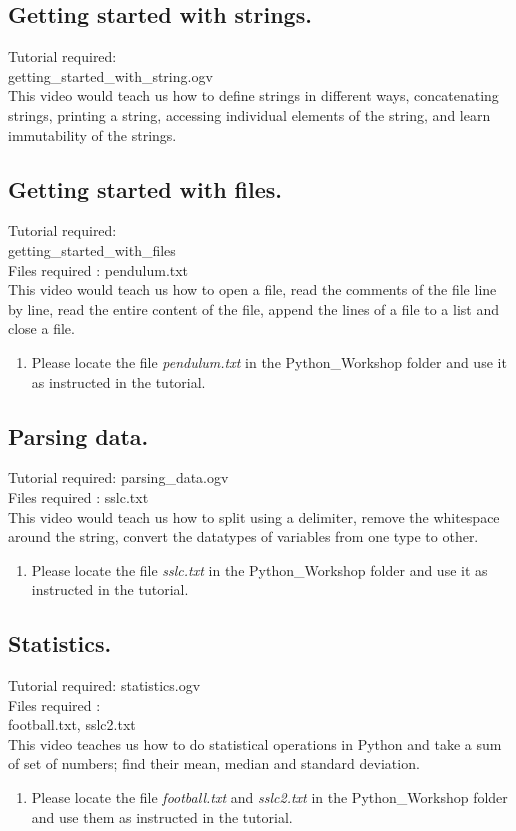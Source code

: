\documentclass[11pt,twocolumn]{article}
\newenvironment{enumcpt}{\begin{enumerate} \topsep 0pt \partopsep 0pt 
                        \parsep 0pt
                        \itemsep 0pt \leftmargin -1in \rightmargin 0pt
                        }{\end{enumerate}}
\begin{document}
\subsection{Getting started with strings.}
Tutorial required: \\getting\_started\_with\_string.ogv \\
This video would teach us how to define strings in different ways, concatenating strings, printing a string, accessing individual elements of the string, and learn immutability of the strings. 
\subsection{Getting started with files.}
Tutorial required: \\getting\_started\_with\_files \\
Files required : pendulum.txt \\
This video would teach us how to open a file, read the comments of the file line by line, read the entire content of the file, append the lines of a file to a list and close a file.
\begin{enumcpt}
\item Please locate the file \emph{pendulum.txt} in the Python\_Workshop folder and use it
      as instructed in the tutorial. 
\end{enumcpt}

\subsection{Parsing data.}
Tutorial required: parsing\_data.ogv \\
Files required : sslc.txt \\
This video would teach us how to split using a delimiter, remove the whitespace around the string, convert the datatypes  of variables from one type to other. 
\begin{enumcpt}
\item Please locate the file \emph{sslc.txt} in the Python\_Workshop folder and use it
      as instructed in the tutorial. 
\end{enumcpt}

\subsection{Statistics.}
Tutorial required: statistics.ogv \\
Files required :\\ football.txt, sslc2.txt \\
This video teaches us how to do statistical operations in Python and take a sum of set of numbers; find their mean, median and standard deviation. \\
\begin{enumcpt}
\item Please locate the file \emph{football.txt} and \emph{sslc2.txt} in the Python\_Workshop folder and use them
      as instructed in the tutorial. 
\end{enumcpt}
\end{document}
